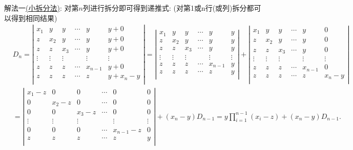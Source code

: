 \documentclass[../../main.tex]{subfiles}
\begin{document}
\begin{solution}
{\color{blue}解法一\hyperref[小拆分法]{(小拆分法)}:}
对第$n$列进行拆分即可得到递推式:
(对第1或n行(或列)拆分都可以得到相同结果)
\begin{align}
&D_n=\left| \begin{matrix}
x_1&		y&		y&		\cdots&		y&		y+0\\
z&		x_2&		y&		\cdots&		y&		y+0\\
z&		z&		x_3&		\cdots&		y&		y+0\\
\vdots&		\vdots&		\vdots&		&		\vdots&		\vdots\\
z&		z&		z&		\cdots&		x_{n-1}&		y+0\\
z&		z&		z&		\cdots&		z&		y+x_n-y\\
\end{matrix} \right|=\left| \begin{matrix}
x_1&		y&		y&		\cdots&		y&		y\\
z&		x_2&		y&		\cdots&		y&		y\\
z&		z&		x_3&		\cdots&		y&		y\\
\vdots&		\vdots&		\vdots&		&		\vdots&		\vdots\\
z&		z&		z&		\cdots&		x_{n-1}&		y\\
z&		z&		z&		\cdots&		z&		y\\
\end{matrix} \right|+\left| \begin{matrix}
x_1&		y&		y&		\cdots&		y&		0\\
z&		x_2&		y&		\cdots&		y&		0\\
z&		z&		x_3&		\cdots&		y&		0\\
\vdots&		\vdots&		\vdots&		&		\vdots&		\vdots\\
z&		z&		z&		\cdots&		x_{n-1}&		0\\
z&		z&		z&		\cdots&		z&		x_n-y\\
\end{matrix} \right|
\nonumber\\
&=\left| \begin{matrix}
x_1-z&		0&		0&		\cdots&		0&		0\\
0&		x_2-z&		0&		\cdots&		0&		0\\
0&		0&		x_3-z&		\cdots&		0&		0\\
\vdots&		\vdots&		\vdots&		&		\vdots&		\vdots\\
0&		0&		0&		\cdots&		x_{n-1}-z&		0\\
z&		z&		z&		\cdots&		z&		y\\
\end{matrix} \right|+\left( x_n-y \right) D_{n-1}=y\prod\limits_{i=1}^{n-1}{\left( x_i-z \right)}+\left( x_n-y \right) D_{n-1}.

\end{align}
\end{solution}
\end{document}
